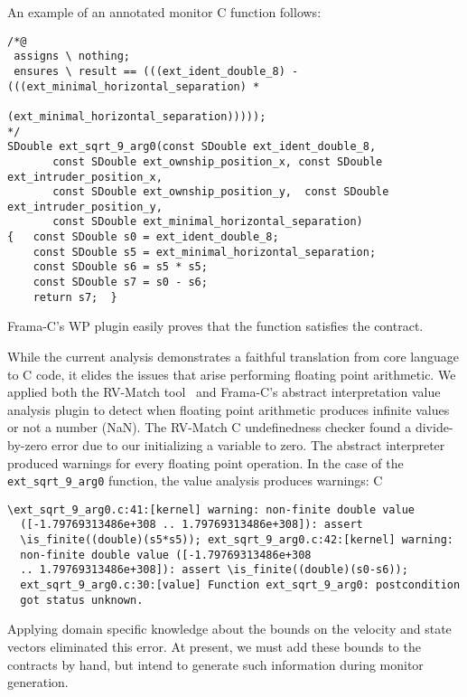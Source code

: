 An example of an annotated monitor C function follows: 

\begin{Verbatim}[fontsize=\scriptsize]
/*@
 assigns \ nothing;
 ensures \ result == (((ext_ident_double_8) - (((ext_minimal_horizontal_separation) *
                                 (ext_minimal_horizontal_separation)))));
*/
SDouble ext_sqrt_9_arg0(const SDouble ext_ident_double_8,
       const SDouble ext_ownship_position_x, const SDouble ext_intruder_position_x,
       const SDouble ext_ownship_position_y,  const SDouble ext_intruder_position_y,
       const SDouble ext_minimal_horizontal_separation)
{   const SDouble s0 = ext_ident_double_8;
    const SDouble s5 = ext_minimal_horizontal_separation;
    const SDouble s6 = s5 * s5;
    const SDouble s7 = s0 - s6;
    return s7;  }
\end{Verbatim}

\noindent
Frama-C's WP plugin easily proves that the function satisfies the
contract. 

While the current analysis demonstrates a faithful translation from
core language to C code, it elides the issues that arise performing
floating point arithmetic.  We applied both the RV-Match
tool~\cite{RV-Match} and Frama-C's abstract interpretation value
analysis plugin to detect when floating point arithmetic produces
infinite values or not a number (NaN).  The RV-Match C undefinedness
checker found a divide-by-zero error due to our initializing a
variable to zero.  The abstract interpreter produced warnings for
every floating point operation. In the case of the
\texttt{ext\_sqrt\_9\_arg0} function, the value analysis produces
warnings: C\begin{Verbatim}[fontsize=\scriptsize]
  \ext_sqrt_9_arg0.c:41:[kernel] warning: non-finite double value
  ([-1.79769313486e+308 .. 1.79769313486e+308]): assert
  \is_finite((double)(s5*s5)); ext_sqrt_9_arg0.c:42:[kernel] warning:
  non-finite double value ([-1.79769313486e+308
  .. 1.79769313486e+308]): assert \is_finite((double)(s0-s6));
  ext_sqrt_9_arg0.c:30:[value] Function ext_sqrt_9_arg0: postcondition
  got status unknown.
\end{Verbatim}
Applying domain specific knowledge about  the  bounds on the velocity and state
vectors  eliminated this
error.  At present, we must add these bounds to the
contracts by hand, but intend to generate  such
information during monitor generation.  

